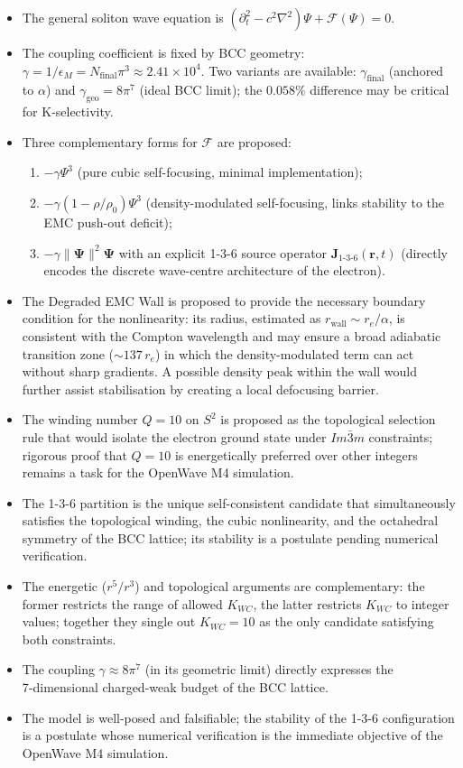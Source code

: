 \documentclass[10pt,a4paper]{article}
\begin{document}
\begin{itemize}
	\item The general soliton wave equation is
	$(\partial_{t}^{2} - c^{2}\nabla^{2})\Psi + \mathcal{F}(\Psi) = 0$.
	\item The coupling coefficient is fixed by BCC geometry:
	$\gamma = 1/\epsilon_{M} = N_{\text{final}}\pi^{3} \approx 2.41\times 10^{4}$.
	Two variants are available: $\gamma_{\text{final}}$ (anchored to $\alpha$) and
	$\gamma_{\text{geo}} = 8\pi^{7}$ (ideal BCC limit); the $0.058\%$ difference
	may be critical for K‑selectivity.
	\item Three complementary forms for $\mathcal{F}$ are proposed:
	\begin{enumerate}
		\item[Variant A:] $-\gamma\Psi^{3}$ (pure cubic self-focusing,
		minimal implementation);
		\item[Variant B:] $-\gamma(1-\rho/\rho_{0})\Psi^{3}$ (density-modulated
		self-focusing, links stability to the EMC push-out deficit);
		\item[Variant C:] $-\gamma\|\mathbf{\Psi}\|^{2}\mathbf{\Psi}$ with an
		explicit 1-3-6 source operator $\mathbf{J}_{1\text{-}3\text{-}6}(\mathbf{r},t)$
		(directly encodes the discrete wave-centre architecture of the electron).
	\end{enumerate}
	\item The Degraded EMC Wall is proposed to provide the necessary boundary
	condition for the nonlinearity: its radius, estimated as $r_{\text{wall}} \sim
	r_e / \alpha$, is consistent with the Compton wavelength and may ensure a broad
	adiabatic transition zone ($\sim 137\,r_e$) in which the density-modulated
	term can act without sharp gradients.  A possible density peak within the wall
	would further assist stabilisation by creating a local defocusing barrier.
	\item The winding number $Q=10$ on $S^{2}$ is proposed as the topological
	selection rule that would isolate the electron ground state under
	$Im\bar{3}m$ constraints; rigorous proof that $Q=10$ is energetically
	preferred over other integers remains a task for the OpenWave M4 simulation.
	\item The 1-3-6 partition is the unique self-consistent candidate that
	simultaneously satisfies the topological winding, the cubic nonlinearity,
	and the octahedral symmetry of the BCC lattice; its stability is a postulate
	pending numerical verification.
	\item The energetic ($r^{5}/r^{3}$) and topological arguments are complementary:
	the former restricts the range of allowed $K_{WC}$, the latter restricts $K_{WC}$ to
	integer values; together they single out $K_{WC}=10$ as the only candidate
	satisfying both constraints.
	\item The coupling $\gamma \approx 8\pi^{7}$ (in its geometric limit) directly
	expresses the 7‑dimensional charged-weak budget of the BCC lattice.
	\item The model is well-posed and falsifiable; the stability of the 1-3-6
	configuration is a postulate whose numerical verification is the immediate
	objective of the OpenWave M4 simulation.
\end{itemize}
\end{document}
